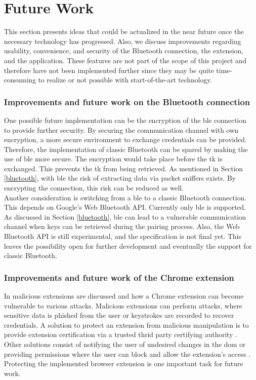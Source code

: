 \section{Future Work} \label{futurework}
This section presents ideas that could be actualized in the near future once the necessary technology has progressed. Also, we discuss improvements regarding usability, convenience, and security of the Bluetooth connection, the extension, and the application. These features are not part of the scope of this project and therefore have not been implemented further since they may be quite time-consuming to realize or not possible with start-of-the-art technology.

\subsubsection*{Improvements and future work on the Bluetooth connection}
One possible future implementation can be the encryption of the \gls{ble} connection to provide further security. By securing the communication channel with own encryption, a more secure environment to exchange credentials can be provided. Therefore, the implementation of classic Bluetooth can be spared by making the use of \gls{ble} more secure. The encryption would take place before the \gls{tk} is exchanged. This prevents the \gls{tk} from being retrieved. As mentioned in Section \ref{bluetooth}, with \gls{ble} the risk of extracting data  via packet sniffers  exists. By encrypting the connection, this risk can be reduced as well. \\

Another consideration is switching from a \gls{ble} to a classic Bluetooth connection. This depends on Google's Web Bluetooth API. Currently only \gls{ble} is supported. As discussed in Section \ref{bluetooth}, \gls{ble} can lead to a vulnerable communication channel when keys can be retrieved during the pairing process. Also, the Web Bluetooth API is still experimental, and the specification is not final yet. This leaves the possibility open for further development and eventually the support for classic Bluetooth.
 
\subsubsection*{Improvements and future work of the Chrome extension}
In \cite{DBLP:conf/icoin/VarshneyBS18} malicious extensions are discussed and how a Chrome extension can become vulnerable to various attacks. Malicious extensions can perform attacks, where sensitive data is phished from the user or keystrokes are recorded to recover credentials. A solution to protect an extension from malicious manipulation is to provide extension certification via a trusted thrid party certifying authority \cite{DBLP:conf/icoin/VarshneyBS18}. Other solutions consist of notifying the user of undesired changes in the \gls{dom} or providing permissions where the user can block and allow the extension's access \cite{DBLP:conf/icoin/VarshneyBS18}. Protecting the implemented browser extension is one important task for future work. \\

